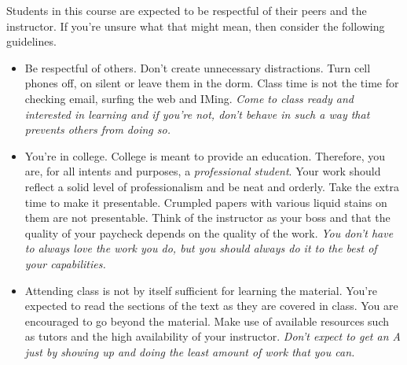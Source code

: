 \documentclass[10pt]{article}
\begin{document}
Students in this course are expected to be respectful of their peers and the instructor. If you're unsure what that might mean, then consider the following guidelines. 
\begin{itemize}
\item Be respectful of others.  Don't create unnecessary distractions.  Turn cell phones off, on silent or leave them in the dorm.  Class time is not the time for checking email, surfing the web and IMing.  \textit{Come to class ready and interested in learning and if you're not, don't behave in such a way that prevents others from doing so.}
\item You're in college.  College is meant to provide an education.  Therefore, you are, for all intents and purposes, a \textit{professional student}.  Your work should reflect a solid level of professionalism and be neat and orderly.  Take the extra time to make it presentable.  Crumpled papers with various liquid stains on them are not presentable.  Think of the instructor as your boss and that the quality of your paycheck depends on the quality of the work.  \textit{You don't have to always love the work you do, but you should always do it to the best of your capabilities.}
\item Attending class is not by itself sufficient for learning the material.  You're expected to read the sections of the text as they are covered in class.  You are encouraged to go beyond the material.  Make use of available resources such as tutors and the high availability of your instructor.  \textit{Don't expect to get an A just by showing up and doing the least amount of work that you can.}
\end{itemize}
\end{document}
